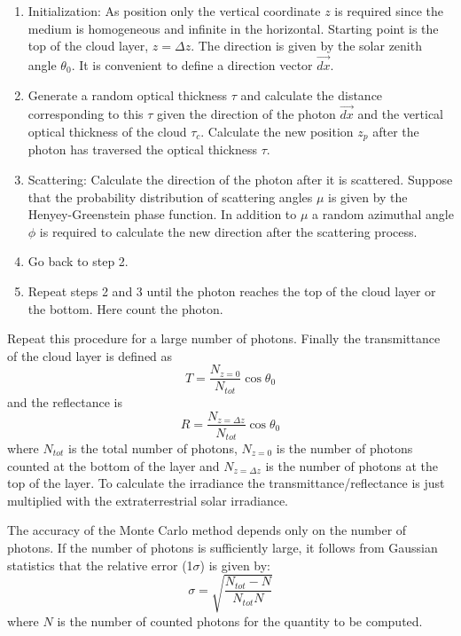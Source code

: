 \documentclass[12pt,twoside,a4paper]{article}
\begin{document}
\begin{enumerate}
\item Initialization: As position only the vertical coordinate $z$ is
  required since the medium is homogeneous and infinite in the
  horizontal. Starting point is the top of the cloud layer, $z=\Delta z$.
  The direction is given by the solar zenith angle $\theta_0$. 
  It is convenient to define a direction vector $\vec{dx}$.
\item Generate a random optical thickness $\tau$ and calculate the
  distance corresponding to this $\tau$ given the direction of the
  photon $\vec{dx}$ and the vertical optical thickness of the cloud
  $\tau_c$. Calculate the new position $z_p$ after the photon has
  traversed the optical thickness $\tau$.
\item Scattering: Calculate the direction of the photon after it is
  scattered. Suppose that the probability distribution of scattering angles
  $\mu$ is given by the Henyey-Greenstein phase function. In addition
  to $\mu$ a random azimuthal angle $\phi$ is required to calculate
  the new direction after the scattering process. 
\item Go back to step 2.
\item Repeat steps 2 and 3 until the photon reaches the top of the
  cloud layer or the bottom. Here count the photon. 
\end{enumerate}
Repeat this procedure for a large number of photons. Finally the
transmittance of the cloud layer is defined as
\begin{equation}
  T = \frac{N_{z=0}}{N_{tot}}\cos\theta_0
\end{equation}
and the reflectance is
\begin{equation}
  R = \frac{N_{z=\Delta z}}{N_{tot}}\cos\theta_0
\end{equation}
where $N_{tot}$ is the total number of photons, $N_{z=0}$ is the number of
photons counted at the bottom of the layer and $N_{z=\Delta z}$ is the
number of photons at the top of the layer. To calculate the irradiance
the transmittance/reflectance is just multiplied with the
extraterrestrial solar irradiance.  

The accuracy of the Monte Carlo method depends only on the number of
photons. If the number of photons is sufficiently large, it follows
from Gaussian statistics that the relative error (1$\sigma$) is given by:
\begin{equation}
  \label{eq:error}
  \sigma = \sqrt{\frac{N_{tot}-N}{N_{tot}N}}
\end{equation}
where $N$ is the number of counted photons for the quantity to be computed.
\end{document}
